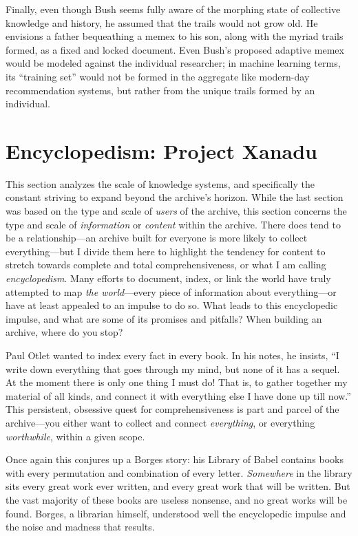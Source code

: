 Finally, even though Bush seems fully aware of the morphing state of collective knowledge and history, he assumed that the trails would not grow old. He envisions a father bequeathing a memex to his son, along with the myriad trails formed, as a fixed and locked document. Even Bush's proposed adaptive memex would be modeled against the individual researcher; in machine learning terms, its ``training set'' would not be formed in the aggregate like modern-day recommendation systems, but rather from the unique trails formed by an individual.

\section{Encyclopedism: Project Xanadu}

This section analyzes the scale of knowledge systems, and specifically the constant striving to expand beyond the archive's horizon. While the last section was based on the type and scale of \emph{users} of the archive, this section concerns the type and scale of \emph{information} or \emph{content} within the archive. There does tend to be a relationship---an archive built for everyone is more likely to collect everything---but I divide them here to highlight the tendency for content to stretch towards complete and total comprehensiveness, or what I am calling \emph{encyclopedism}. Many efforts to document, index, or link the world have truly attempted to map \emph{the world}---every piece of information about everything---or have at least appealed to an impulse to do so. What leads to this encyclopedic impulse, and what are some of its promises and pitfalls? When building an archive, where do you stop?

Paul Otlet wanted to index every fact in every book. In his notes, he insists, ``I write down everything that goes through my mind, but none of it has a sequel. At the moment there is only one thing I must do! That is, to gather together my material of all kinds, and connect it with everything else I have done up till now.''\autocite[20]{reagle_good_2010} This persistent, obsessive quest for comprehensiveness is part and parcel of the archive---you either want to collect and connect \emph{everything}, or everything \emph{worthwhile}, within a given scope.

Once again this conjures up a Borges story: his Library of Babel contains books with every permutation and combination of every letter. \emph{Somewhere} in the library sits every great work ever written, and every great work that will be written. But the vast majority of these books are useless nonsense, and no great works will be found. Borges, a librarian himself, understood well the encyclopedic impulse and the noise and madness that results.\autocite[112-18]{borges_collected_1999}

